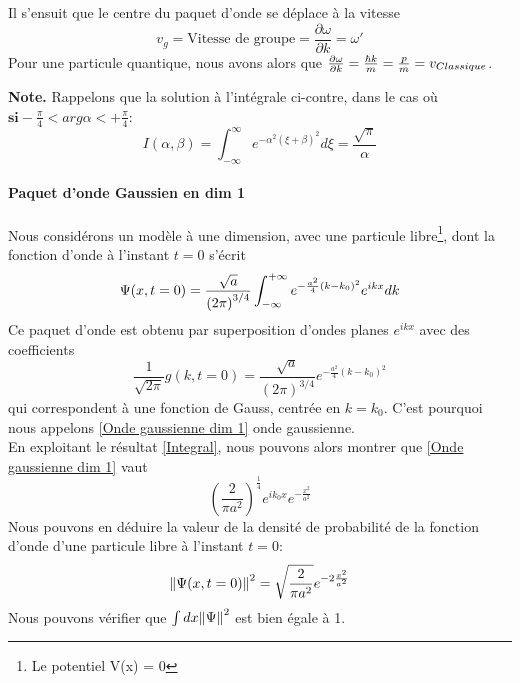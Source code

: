 \documentclass[../notesdecours]{subfiles}
\begin{document}
Il s'ensuit que le centre du paquet d'onde se déplace à la vitesse 
\begin{equation}
v_g = \text{Vitesse de groupe} = \frac{\partial \omega}{\partial k} = \omega'
\end{equation}
Pour une particule quantique, nous avons alors que $\frac{\partial \omega}{\partial k} = \frac{\hbar k}{m} = \frac{p}{m} = v_{Classique}$.

\textbf{Note.} Rappelons que la solution à l'intégrale ci-contre, dans le cas où $\textbf{si} -\frac{\pi}{4} < arg \alpha < + \frac{\pi}{4}$:
\begin{equation}
I(\alpha,\beta) =\int_{-\infty}^{\infty} e^{-\alpha^2 \left(\xi+\beta\right)^2} d\xi = \frac{\sqrt{\pi}}{\alpha}
\label{Integral}
\end{equation}

\paragraph{Paquet d'onde Gaussien en dim 1}
Nous considérons un modèle à une dimension, avec une particule libre\footnote{Le potentiel V(x) = 0}, dont la fonction d'onde à l'instant $t = 0$ s'écrit
\begin{equation}
\Psi(x,t=0) = \frac{\sqrt{a}}{\left(2\pi\right)^{3/4}} \int_{-\infty}^{+\infty} e^{- \frac{a^2}{4} (k-k_0)^2} e^{ikx} dk\\
\label{Onde gaussienne dim 1}
\end{equation}
Ce paquet d'onde est obtenu par superposition d'ondes planes $e^{ikx}$ avec des coefficients 
\begin{equation}
\frac{1}{\sqrt{2\pi}} g(k,t=0) = \frac{\sqrt{a}}{\left(2\pi\right)^{3/4}} e^{-\frac{a^2}{4}(k-k_0)^2}
\end{equation}
qui correspondent à une fonction de Gauss, centrée en $k = k_0$. C'est pourquoi nous appelons \eqref{Onde gaussienne dim 1} onde gaussienne.\\

En exploitant le résultat \eqref{Integral}, nous pouvons alors montrer que \ref{Onde gaussienne dim 1} vaut
\begin{equation}
\left( \frac{2}{\pi a^2}\right)^{\frac{1}{4}} e^{ik_0x}e^{- \frac{x^2}{a^2}}
\end{equation}
Nous pouvons en déduire la valeur de la densité de probabilité de la fonction d'onde d'une particule libre à l'instant $t = 0$:
\begin{equation}
\norm{\Psi(x,t=0)}^2 = \sqrt{\frac{2}{\pi a^2}} e^{-2 \frac{x^2}{a^2}}
\end{equation}
Nous pouvons vérifier que $\int dx \norm{\Psi}^2$ est bien égale à 1.\\
\end{document}
